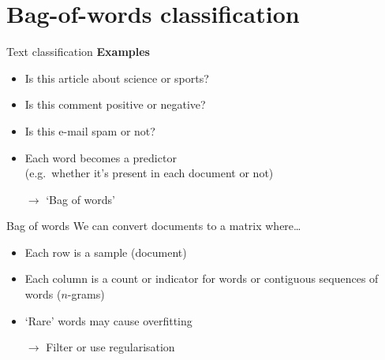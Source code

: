 \section{Bag\hyp{}of\hyp{}words classification}

\begin{frame}{Text classification}
    \textbf{Examples}
    \begin{itemize}
        \item Is this article about science or sports?
        \item Is this comment positive or negative?
        \item Is this e\hyp{}mail spam or not?
    \end{itemize}
    \vfill\pause
    \begin{itemize}
        \item Each word becomes a predictor \\
              (e.g.\ whether it's present in each document or not)
        \item[$\rightarrow$] `Bag of words'
    \end{itemize}
\end{frame}

\begin{frame}{Bag of words}
    We can convert documents to a matrix where\ldots
    \begin{itemize}
        \item Each row is a sample (document)
        \item Each column is a count or indicator for words or contiguous
              sequences of words ($n$\hyp{}grams)
    \end{itemize}
    \vfill\pause
    \begin{itemize}
        \item `Rare' words may cause overfitting
        \item[$\rightarrow$] Filter or use regularisation
    \end{itemize}
\end{frame}

